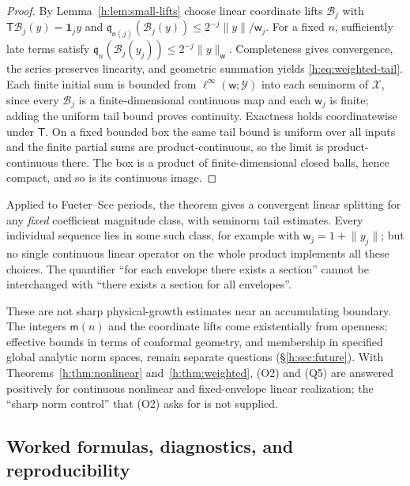 \documentclass[11pt,a4paper]{article}
\numberwithin{equation}{section}
\theoremstyle{definition}
\theoremstyle{remark}
\theoremstyle{plain}
\newcommand{\norm}[1]{\lVert #1\rVert}
\begin{document}
\begin{proof}
By Lemma~\ref{h:lem:small-lifts} choose linear coordinate lifts $\mathcal B_j$
with $\mathsf T\mathcal B_j(y)=\mathbf 1_jy$ and
$\mathfrak q_{\mathsf n(j)}(\mathcal B_j(y))\le2^{-j}\norm y/\mathsf w_j$. For a
fixed $n$, sufficiently late terms satisfy
$\mathfrak q_n(\mathcal B_j(y_j))\le2^{-j}\norm y_{\mathsf w}$. Completeness
gives convergence, the series preserves linearity, and geometric summation
yields \eqref{h:eq:weighted-tail}. Each finite initial sum is bounded from
$\ell^\infty(\mathsf w;\mathcal Y)$ into each seminorm of $\mathcal X$, since
every $\mathcal B_j$ is a finite-dimensional continuous map and each
$\mathsf w_j$ is finite; adding the uniform tail bound proves continuity.
Exactness holds coordinatewise under $\mathsf T$. On a fixed bounded box the
same tail bound is uniform over all inputs and the finite partial sums are
product-continuous, so the limit is product-continuous there. The box is a
product of finite-dimensional closed balls, hence compact, and so is its
continuous image.
\end{proof}

Applied to Fueter--Sce periods, the theorem gives a convergent linear
splitting for any \emph{fixed} coefficient magnitude class, with seminorm tail
estimates. Every individual sequence lies in some such class, for example with
$\mathsf w_j=1+\norm{y_j}$; but no single continuous linear operator on the
whole product implements all these choices. The quantifier ``for each envelope
there exists a section'' cannot be interchanged with ``there exists a section
for all envelopes''.

These are not sharp physical-growth estimates near an accumulating boundary.
The integers $\mathsf m(n)$ and the coordinate lifts come existentially from
openness; effective bounds in terms of conformal geometry, and membership in
specified global analytic norm spaces, remain separate questions
(\S\ref{h:sec:future}). With Theorems~\ref{h:thm:nonlinear}
and~\ref{h:thm:weighted}, (O2) and (Q5) are answered positively for continuous
nonlinear and fixed-envelope linear realization; the ``sharp norm control''
that (O2) asks for is not supplied.

\subsection{Worked formulas, diagnostics, and reproducibility}
\label{h:sec:verification}
\end{document}
